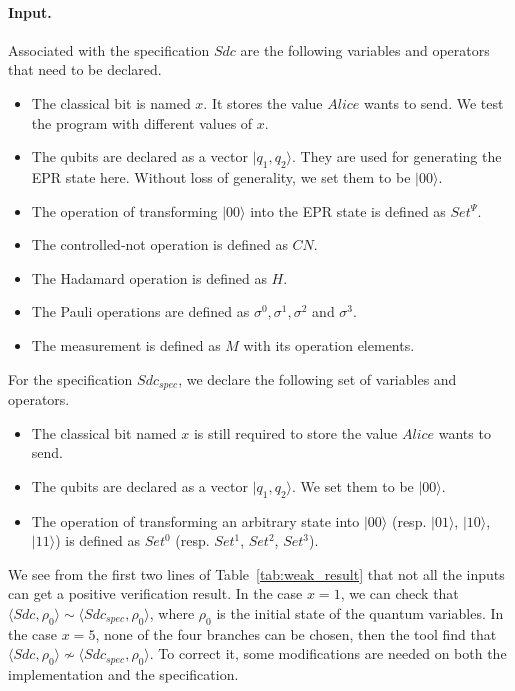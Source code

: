 \documentclass[runningheads]{llncs}
\begin{document}
\paragraph{Input.}
Associated with the specification $Sdc$ are the following variables and operators that need to be declared.
\begin{itemize}
    \item The classical bit is named $x$. It stores the value $Alice$ wants to send. We test the program with different values of $x$.
    \item The qubits are declared as a vector $|q_1,q_2\rangle$. They are used for generating the EPR state here. Without loss of generality, we set them to be $|00\rangle$.
    \item The operation of transforming $|00\rangle$ into the EPR state is defined as $Set^{\Psi}$. 
    \item The controlled-not operation is defined as $CN$.
    \item The Hadamard operation is defined as $H$.
    \item The Pauli operations are defined as $\sigma^0,\sigma^1,\sigma^2$ and $\sigma^3$.
    \item The measurement is defined as $M$ with its operation elements.
\end{itemize}

For the specification $Sdc_{spec}$, we declare the following set of variables and operators.
\begin{itemize}
    \item The classical bit named $x$ is still required to store the value $Alice$ wants to send.
    \item The qubits are declared as a vector $|q_1,q_2\rangle$. We set them to be $|00\rangle$.
    \item The operation of transforming an arbitrary state into $|00\rangle$ (resp. $|01\rangle$, $|10\rangle$, $|11\rangle$) is defined as $Set^{0}$ (resp. $Set^{1}$, $Set^{2}$, $Set^{3}$).
\end{itemize}

We see from the first two lines of Table~\ref{tab:weak_result} that not all the inputs can get a positive verification result. In the case $x=1$, we can check that $\langle Sdc,\rho_0\rangle \sim \langle Sdc_{spec},\rho_0\rangle$, where $\rho_0$ is the initial state of the quantum variables. In the case $x=5$, none of the four branches can be chosen, then the tool find that $\langle Sdc,\rho_0\rangle \not\sim \langle Sdc_{spec},\rho_0\rangle$. To correct it, some modifications are needed on both the implementation and the specification.
\end{document}
